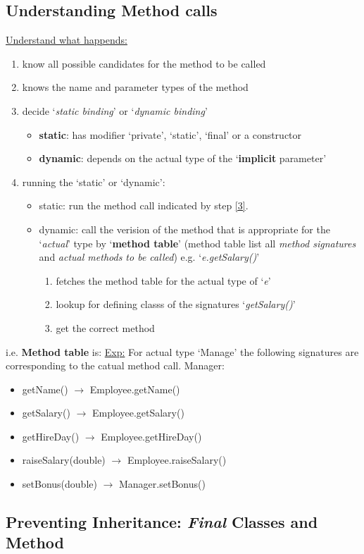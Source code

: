 \documentclass[12pt]{article}
\begin{document}
\subsection{Understanding Method calls}
\underline{Understand what happends:}
\begin{enumerate}
    \item know all possible candidates for the method to be called
    \item knows the name and parameter types of the method
    \item \label{3} decide `\emph{static binding}' or `\emph{dynamic binding}'
    \begin{itemize}
        \item \textbf{static}: has modifier `private', `static', `final' or a constructor
        \item \textbf{dynamic}: depends on the actual type of the `\textbf{implicit} parameter' 
    \end{itemize}
    \item running the `static' or `dynamic':
    \begin{itemize}
        \item static: run the method call indicated by step \ref{3}.
        \item dynamic: call the verision of the method that is appropriate for the `\textit{actual}' type by `\textbf{method table}'
        (method table list all \textit{method signatures} and \textit{actual methods to be called})\newline
        e.g. `\emph{e.getSalary()}'
        \begin{enumerate}
            \item fetches the method table for the actual type of `\textit{e}'
            \item lookup for defining classs of the signatures `\textit{getSalary()}'
            \item get the correct method
        \end{enumerate}
    \end{itemize}
\end{enumerate}
i.e. \textbf{Method table} is: \newline
\underline{Exp:} For actual type `Manage' the following signatures are corresponding to the catual method call.\newline
Manager:
\begin{itemize}
    \item getName() $\rightarrow$ Employee.getName()
    \item getSalary() $\rightarrow$ Employee.getSalary()
    \item getHireDay() $\rightarrow$ Employee.getHireDay()
    \item raiseSalary(double) $\rightarrow$ Employee.raiseSalary()
    \item setBonus(double) $\rightarrow$ Manager.setBonus()
\end{itemize}

\subsection{Preventing Inheritance: \emph{Final} Classes and Method}
\end{document}
